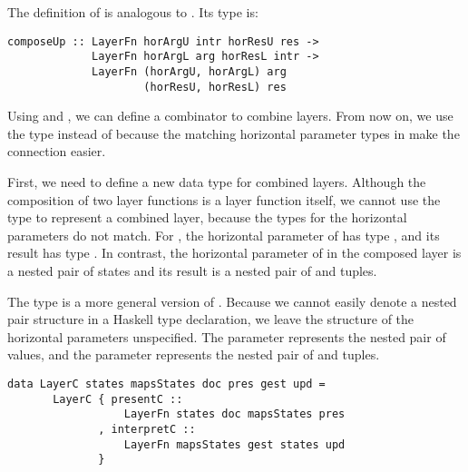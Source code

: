 \documentclass[preprint,natbib]{sigplanconf}
\begin{document}



The definition of  is analogous to . Its type is:

\begin{small}
\begin{verbatim}
composeUp :: LayerFn horArgU intr horResU res ->
             LayerFn horArgL arg horResL intr ->
             LayerFn (horArgU, horArgL) arg
                     (horResU, horResL) res
\end{verbatim}
\end{small}


Using  and , we can define a combinator to combine  layers. 
\bc From now on, we use the type  instead of  because the matching horizontal parameter types in  make the connection easier. \ec


First, we need to define a new data type for combined layers. Although the composition of two layer functions is a layer function itself, we cannot use the type  to represent a combined layer, because the types for the horizontal parameters do not match.  For , the horizontal parameter of  has type , and its result has type . In contrast, the horizontal parameter of  in the composed layer is a nested pair of states and its result is a nested pair of  and  tuples. 

The type  is a more general version of . Because we cannot easily denote a nested pair structure in a Haskell type declaration, we leave the structure of the horizontal parameters unspecified. The parameter  represents the nested pair of  values, and the parameter  represents the nested pair of  and  tuples.

\begin{small}
\begin{verbatim}
data LayerC states mapsStates doc pres gest upd =
       LayerC { presentC ::   
                  LayerFn states doc mapsStates pres
              , interpretC :: 
                  LayerFn mapsStates gest states upd
              }
\end{verbatim}
\end{small}
\end{document}
